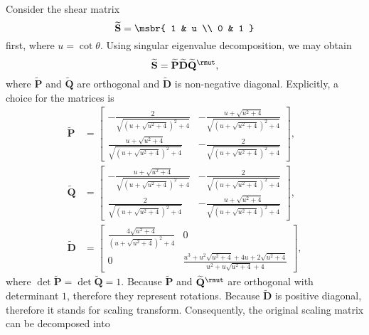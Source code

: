 \documentclass[english, nochinese]{../textmpls/pkupaper}
\title{\titlemark}
\author{\authoring}
\begin{document}
\maketitle

\begin{thmquestion}
\ 
\begin{thmanswer}
Consider the shear matrix
\begin{equation}
\widetilde{\mathbf{S}} = \msbr{ 1 & u \\ 0 & 1 }
\end{equation}
first, where $ u = \cot \theta $. Using singular eigenvalue decomposition, we may obtain
\begin{equation}
\widetilde{\mathbf{S}} = \widetilde{\mathbf{P}} \widetilde{\mathbf{D}} \widetilde{\mathbf{Q}}^{\rmut},
\end{equation}
where $\widetilde{\mathbf{P}}$ and $\widetilde{\mathbf{Q}}$ are orthogonal and $\widetilde{\mathbf{D}}$ is non-negative diagonal. Explicitly, a choice for the matrices is
\begin{align}
\widetilde{\mathbf{P}} &= \left[\begin{matrix}- \frac{2}{\sqrt{\left(u + \sqrt{u^{2} + 4}\right)^{2} + 4}} & - \frac{u + \sqrt{u^{2} + 4}}{\sqrt{\left(u + \sqrt{u^{2} + 4}\right)^{2} + 4}}\\\frac{u + \sqrt{u^{2} + 4}}{\sqrt{\left(u + \sqrt{u^{2} + 4}\right)^{2} + 4}} & - \frac{2}{\sqrt{\left(u + \sqrt{u^{2} + 4}\right)^{2} + 4}}\end{matrix}\right], \\
\widetilde{\mathbf{Q}} &= \left[\begin{matrix}- \frac{u + \sqrt{u^{2} + 4}}{\sqrt{\left(u + \sqrt{u^{2} + 4}\right)^{2} + 4}} & - \frac{2}{\sqrt{\left(u + \sqrt{u^{2} + 4}\right)^{2} + 4}}\\\frac{2}{\sqrt{\left(u + \sqrt{u^{2} + 4}\right)^{2} + 4}} & - \frac{u + \sqrt{u^{2} + 4}}{\sqrt{\left(u + \sqrt{u^{2} + 4}\right)^{2} + 4}}\end{matrix}\right], \\
\widetilde{\mathbf{D}} &= \left[\begin{matrix}\frac{4 \sqrt{u^{2} + 4}}{\left(u + \sqrt{u^{2} + 4}\right)^{2} + 4} & 0\\0 & \frac{u^{3} + u^{2} \sqrt{u^{2} + 4} + 4 u + 2 \sqrt{u^{2} + 4}}{u^{2} + u \sqrt{u^{2} + 4} + 4}\end{matrix}\right],
\end{align}
where $ \det \widetilde{\mathbf{P}} = \det \widetilde{\mathbf{Q}} = 1 $. Because $\widetilde{\mathbf{P}}$ and $\widetilde{\mathbf{Q}}^{\rmut}$ are orthogonal with determinant $1$, therefore they represent rotations. Because $\widetilde{\mathbf{D}}$ is positive diagonal, therefore it stands for scaling transform. Consequently, the original scaling matrix can be decomposed into

\end{thmanswer}
\end{thmquestion}
\end{document}
